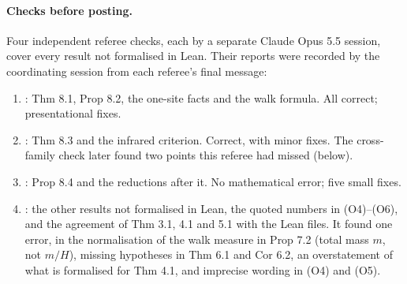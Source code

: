 \documentclass[11pt]{article}
\begin{document}
\paragraph{Checks before posting.} Four independent referee checks, each by a separate Claude Opus 5.5 session, cover every result not formalised in Lean. Their reports were recorded by the coordinating session from each referee's final message:
\begin{enumerate}
\item {}: Thm 8.1, Prop 8.2, the one-site facts and the walk formula. All correct; presentational fixes.
\item {}: Thm 8.3 and the infrared criterion. Correct, with minor fixes. The cross-family check later found two points this referee had missed (below).
\item {}: Prop 8.4 and the reductions after it. No mathematical error; five small fixes.
\item {}: the other results not formalised in Lean, the quoted numbers in (O4)--(O6), and the agreement of Thm 3.1, 4.1 and 5.1 with the Lean files. It found one error, in the normalisation of the walk measure in Prop 7.2 (total mass $m$, not $m/H$), missing hypotheses in Thm 6.1 and Cor 6.2, an overstatement of what is formalised for Thm 4.1, and imprecise wording in (O4) and (O5).
\end{enumerate}
\end{document}
